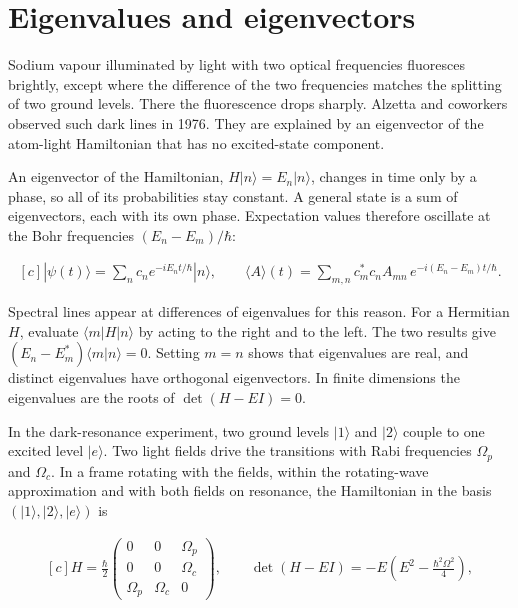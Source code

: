 \documentclass[11pt,oneside]{book}
\newenvironment{centeredalign}{\[\begin{gathered}[c]}{\end{gathered}\]}
\begin{document}
\clearpage

\section{Eigenvalues and eigenvectors}

\label{topic:eigenvalues-and-eigenvectors}

Sodium vapour illuminated by light with two optical frequencies fluoresces brightly, except where the difference of the two frequencies matches the splitting of two ground levels. There the fluorescence drops sharply. Alzetta and coworkers observed such dark lines in 1976. They are explained by an eigenvector of the atom-light Hamiltonian that has no excited-state component.

An eigenvector of the Hamiltonian, \(H|n\rangle=E_n|n\rangle\), changes in time only by a phase, so all of its probabilities stay constant. A general state is a sum of eigenvectors, each with its own phase. Expectation values therefore oscillate at the Bohr frequencies \((E_n-E_m)/\hbar\):

\begin{centeredalign}
|\psi(t)\rangle=\sum_nc_ne^{-iE_nt/\hbar}|n\rangle,\qquad
\langle A\rangle(t)=\sum_{m,n}c_m^*c_nA_{mn}\,e^{-i(E_n-E_m)t/\hbar}.
\end{centeredalign}

Spectral lines appear at differences of eigenvalues for this reason. For a Hermitian \(H\), evaluate \(\langle m|H|n\rangle\) by acting to the right and to the left. The two results give \((E_n-E_m^*)\langle m|n\rangle=0\). Setting \(m=n\) shows that eigenvalues are real, and distinct eigenvalues have orthogonal eigenvectors. In finite dimensions the eigenvalues are the roots of \(\det(H-EI)=0\).

In the dark-resonance experiment, two ground levels \(|1\rangle\) and \(|2\rangle\) couple to one excited level \(|e\rangle\). Two light fields drive the transitions with Rabi frequencies \(\Omega_p\) and \(\Omega_c\). In a frame rotating with the fields, within the rotating-wave approximation and with both fields on resonance, the Hamiltonian in the basis \((|1\rangle,|2\rangle,|e\rangle)\) is

\begin{centeredalign}
H=\frac\hbar2\begin{pmatrix}0&0&\Omega_p\\0&0&\Omega_c\\ \Omega_p&\Omega_c&0\end{pmatrix},\qquad
\det(H-EI)=-E\left(E^2-\frac{\hbar^2\Omega^2}{4}\right),
\end{centeredalign}
\end{document}
